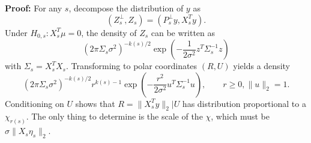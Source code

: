 \documentclass{imsart}
\newcommand{\todo}{\textcolor{red}{\textbf{To do: }}}
\begin{document}
{\bf Proof:}
For any $s$, decompose the distribution of $y$ as
$$
(Z^{\perp}_s,Z_s) = (P_s^{\perp}y, X_s^Ty).
$$
Under $H_{0,s}:X_s^T\mu=0$, the density of $Z_s$ can be written as
$$
(2 \pi \Sigma_s \sigma^2)^{-k(s)/2} \exp \left(-\frac{1}{2 \sigma^2} z^T\Sigma_s^{-1}z \right)
$$
with $\Sigma_s = X_s^TX_s$.
Transforming to polar coordinates $(R,U)$ yields a density
$$
(2 \pi \Sigma_s \sigma^2)^{-k(s)/2} r^{k(s)-1} \exp \left(-\frac{r^2}{2 \sigma^2} u^T\Sigma_s^{-1}u \right), \qquad r \geq 0, \|u\|_2=1.
$$
Conditioning on $U$ shows that $R=\|X_s^Ty\|_2|U$ has distribution proportional to a $\chi_{r(s)}$. The only thing to determine
is the scale of the $\chi$, which must be $\sigma \|X_s\eta_s\|_2$.

%
%
%
%
%
%
\end{document}
